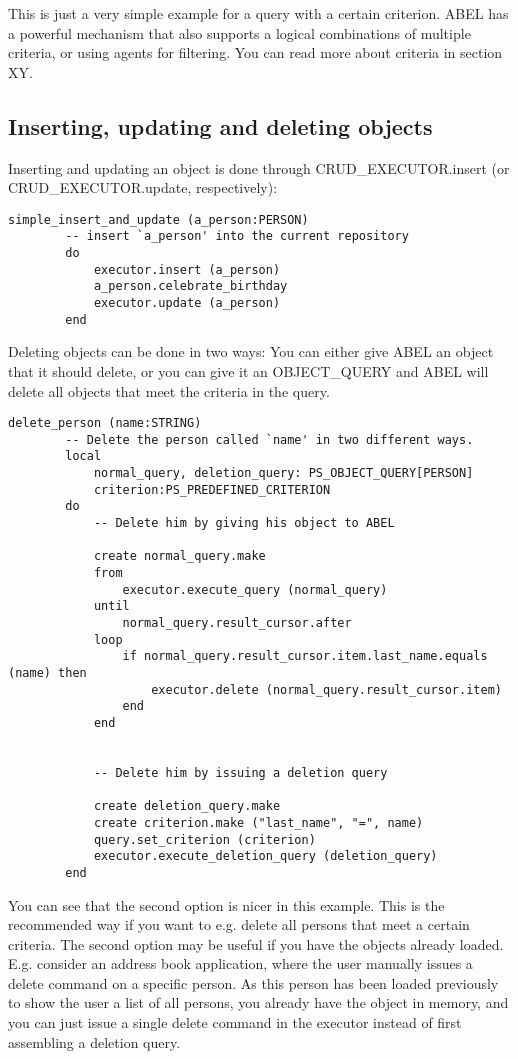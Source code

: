 This is just a very simple example for a query with a certain criterion.
ABEL has a powerful mechanism that also supports a logical combinations of multiple criteria, or using agents for filtering.
You can read more about criteria in section XY.

\subsection{Inserting, updating and deleting objects}

Inserting and updating an object is done through CRUD\_EXECUTOR.insert (or CRUD\_EXECUTOR.update, respectively): 

\begin{lstlisting}[language=OOSC2Eiffel, captionpos=b, caption={}, label={lst:simple_insert}]
	simple_insert_and_update (a_person:PERSON)
		-- insert `a_person' into the current repository
		do
			executor.insert (a_person)
			a_person.celebrate_birthday
			executor.update (a_person)
		end
\end{lstlisting}

Deleting objects can be done in two ways: 
You can either give ABEL an object that it should delete, or you can give it an OBJECT\_QUERY and ABEL will delete all objects that meet the criteria in the query.

\begin{lstlisting}[language=OOSC2Eiffel, captionpos=b, caption={}, label={lst:simple_insert}]
	delete_person (name:STRING)
		-- Delete the person called `name' in two different ways.
		local
			normal_query, deletion_query: PS_OBJECT_QUERY[PERSON]
			criterion:PS_PREDEFINED_CRITERION
		do
			-- Delete him by giving his object to ABEL

			create normal_query.make
			from
				executor.execute_query (normal_query)
			until
				normal_query.result_cursor.after
			loop
				if normal_query.result_cursor.item.last_name.equals (name) then
					executor.delete (normal_query.result_cursor.item)
				end
			end


			-- Delete him by issuing a deletion query

			create deletion_query.make
			create criterion.make ("last_name", "=", name)
			query.set_criterion (criterion)
			executor.execute_deletion_query (deletion_query)
		end
\end{lstlisting}

You can see that the second option is nicer in this example. This is the recommended way if you want to e.g. delete all persons that meet a certain criteria.
The second option may be useful if you have the objects already loaded. E.g. consider an address book application, where the user manually issues a delete command on a specific person.
As this person has been loaded previously to show the user a list of all persons, you already have the object in memory, and you can just issue a single delete command in the executor
instead of first assembling a deletion query.

